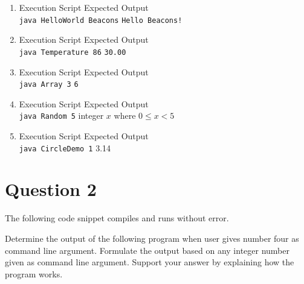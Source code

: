 \documentclass[12pt,letterpaper,twoside]{article}
\begin{document}
\begin{enumerate}[label=\textbf{(\alph*)}]

\item Execution Script \hfill Expected Output\\
\texttt{java HelloWorld Beacons} \hfill \texttt{Hello Beacons!}


\item Execution Script \hfill Expected Output\\
\texttt{java Temperature 86} \hfill \texttt{30.00}


\newpage

\item Execution Script \hfill Expected Output\\
\texttt{java Array 3} \hfill \texttt{6}


\item Execution Script \hfill Expected Output\\
\texttt{java Random 5} \hfill integer $x$ where $0 \leq x < 5$


\newpage

\item Execution Script \hfill Expected Output\\
\texttt{java CircleDemo 1} \hfill 3.14



\end{enumerate}

\newpage

\section*{Question 2}

The following code snippet compiles and runs without error.

Determine the output of the following program when user gives number four as command line argument.
Formulate the output based on any integer number given as command line argument.
Support your answer by explaining how the program works.
\end{document}
